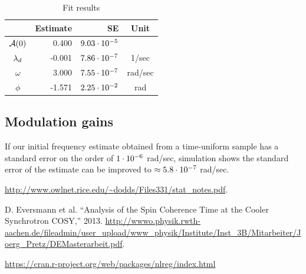 \documentclass{article}
\begin{document}
\begin{table}[h]
	\centering
	\caption{Fit results\label{tbl:FitRes}}
	\begin{tabular}{crrc}
		\hline
		           & Estimate &             SE &  Unit   \\ \hline
		$\mathcal{A}(0)$ &   0.400 & ${9.03}\cdot 10^{-5}$ &         \\
		 $\lambda_d$   &  -0.001 & ${7.86}\cdot 10^{-7}$ &  1/sec  \\
		 $\omega$  &   3.000 & ${7.55}\cdot 10^{-7}$ & rad/sec \\
		  $\phi$   &  -1.571 & ${2.25}\cdot 10^{-2}$ &   rad   \\ \hline
	\end{tabular}
\end{table}

\subsection{Modulation gains}
If our initial frequency estimate obtained from a time-uniform sample has a standard error on the order of ${1}\cdot 10^{-6}$ rad/sec, simulation shows the standard error of the estimate can be improved to $\approx {5.8}\cdot 10^{-7}$ rad/sec.

\begin{thebibliography}{9}
	\url{http://www.owlnet.rice.edu/~dodds/Files331/stat_notes.pdf}.
	
	D. Eversmann et al. ``Analysis of the Spin Coherence Time at the Cooler Synchrotron COSY,'' 2013. \url{http://wwwo.physik.rwth-aachen.de/fileadmin/user_upload/www_physik/Institute/Inst_3B/Mitarbeiter/Joerg_Pretz/DEMasterarbeit.pdf}.
	
	\url{https://cran.r-project.org/web/packages/nlreg/index.html}
	
\end{thebibliography}
\end{document}
